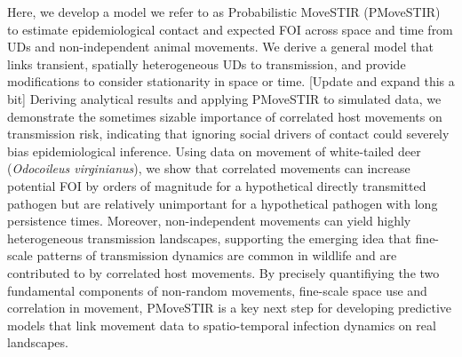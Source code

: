 ﻿\documentclass[11pt]{article}
\begin{document}
Here, we develop a model we refer to as Probabilistic MoveSTIR (PMoveSTIR) to estimate epidemiological contact and expected FOI across space and time from UDs and non-independent animal movements. We derive a general model that links transient, spatially heterogeneous UDs to transmission, and provide modifications to consider stationarity in space or time. [Update and expand this a bit]
Deriving analytical results and applying PMoveSTIR to simulated data, we demonstrate the sometimes sizable importance of correlated host movements on transmission risk, indicating that ignoring social drivers of contact could severely bias epidemiological inference. Using data on movement of white-tailed deer (\emph{Odocoileus virginianus}), we show that correlated movements can increase potential FOI by orders of magnitude for a hypothetical directly transmitted pathogen but are relatively unimportant for a hypothetical pathogen with long persistence times. Moreover, non-independent movements can yield highly heterogeneous transmission landscapes, supporting the emerging idea that fine-scale patterns of transmission dynamics are common in wildlife \citep{Albery2021} and are contributed to by correlated host movements. By precisely quantifiying the two fundamental components of non-random movements, fine-scale space use and correlation in movement, PMoveSTIR is a key next step for developing predictive models that link movement data to spatio-temporal infection dynamics on real landscapes.




\end{document}
